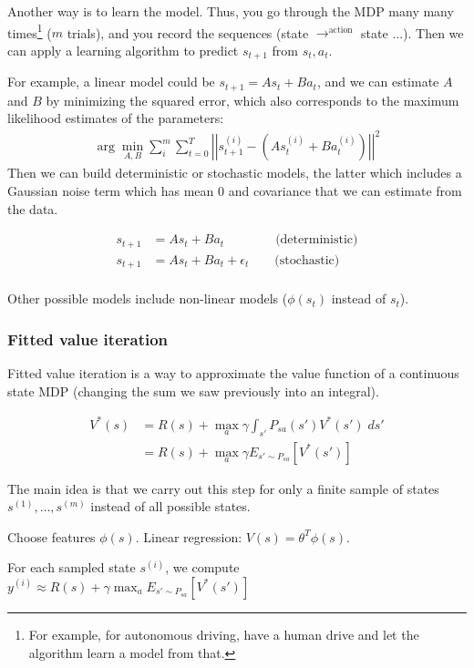 \documentclass[letterpaper,10pt]{article}
\begin{document}
Another way is to learn the model. Thus, you go through the MDP many many times\footnote{For example, for autonomous driving, have a human drive and let the algorithm learn a model from that.} ($m$ trials), and you record the sequences (state $\rightarrow^\text{action}$ state ...). Then we can apply a learning algorithm to predict $s_{t+1}$ from $s_t, a_t$. 

For example, a linear model could be $s_{t+1} = As_t + Ba_t$, and we can estimate $A$ and $B$ by minimizing the squared error, which also corresponds to the maximum likelihood estimates of the parameters:
\begin{align}
\arg \min_{A,B} \sum_{i}^m \sum_{t=0}^T  \left \vert \left \vert s_{t+1}^{(i)} - \left(As_t^{(i)} + Ba_t^{(i)}\right) \right \vert \right \vert^2
\end{align}
Then we can build deterministic or stochastic models, the latter which includes a Gaussian noise term which has mean 0 and covariance that we can estimate from the data.

\begin{align}
s_{t+1} &= As_t + Ba_t \qquad \qquad \text{(deterministic)} \\
s_{t+1} &= As_t + Ba_t + \epsilon_t \qquad \text{(stochastic)} \\
\end{align}

Other possible models include non-linear models ($\phi(s_t)$ instead of $s_t$).

\subsubsection{Fitted value iteration}

Fitted value iteration is a way to approximate the value function of a continuous state MDP (changing the sum we saw previously into an integral).

\begin{align}
V^*(s) &= R(s) + \max_a \gamma \int_{s'} P_{s a} (s') V^* (s') \; ds' \\
&= R(s) + \max_a \gamma E_{s' \sim P_{s a}} [V^* (s')]
\end{align}

The main idea is that we carry out this step for only a finite sample of states $s^{(1)},\ldots,s^{(m)}$ instead of all possible states.

Choose features $\phi(s)$. Linear regression: $V(s) = \theta^T \phi(s)$.

For each sampled state $s^{(i)}$, we compute $y^{(i)} \approx R(s) + \gamma \max_a E_{s' \sim P_{s a}} [V^* (s')]$
\end{document}
